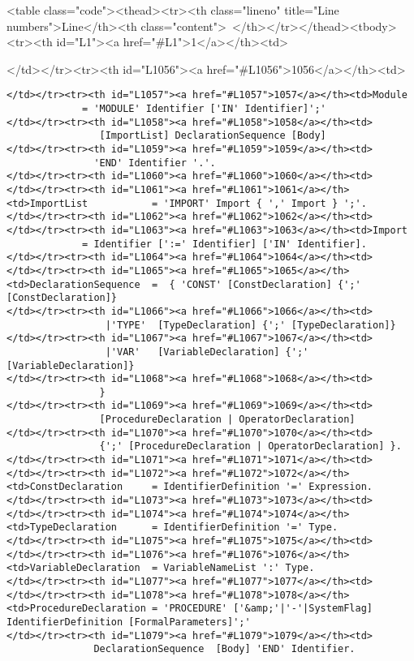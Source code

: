 <table class="code"><thead><tr><th class="lineno" title="Line numbers">Line</th><th class="content"> </th></tr></thead><tbody><tr><th id="L1"><a href="#L1">1</a></th><td>\documentclass[a4paper,11pt]{article}
\begin{document}
</td></tr><tr><th id="L1056"><a href="#L1056">1056</a></th><td>\begin{lstlisting}[language = EBNF, frame=none,xleftmargin=0mm]
</td></tr><tr><th id="L1057"><a href="#L1057">1057</a></th><td>Module               = 'MODULE' Identifier ['IN' Identifier]';'
</td></tr><tr><th id="L1058"><a href="#L1058">1058</a></th><td>                        [ImportList] DeclarationSequence [Body]
</td></tr><tr><th id="L1059"><a href="#L1059">1059</a></th><td>                       'END' Identifier '.'.
</td></tr><tr><th id="L1060"><a href="#L1060">1060</a></th><td>
</td></tr><tr><th id="L1061"><a href="#L1061">1061</a></th><td>ImportList           = 'IMPORT' Import { ',' Import } ';'.
</td></tr><tr><th id="L1062"><a href="#L1062">1062</a></th><td>
</td></tr><tr><th id="L1063"><a href="#L1063">1063</a></th><td>Import               = Identifier [':=' Identifier] ['IN' Identifier].
</td></tr><tr><th id="L1064"><a href="#L1064">1064</a></th><td>
</td></tr><tr><th id="L1065"><a href="#L1065">1065</a></th><td>DeclarationSequence  =  { 'CONST' [ConstDeclaration] {';' [ConstDeclaration]}
</td></tr><tr><th id="L1066"><a href="#L1066">1066</a></th><td>                         |'TYPE'  [TypeDeclaration] {';' [TypeDeclaration]}
</td></tr><tr><th id="L1067"><a href="#L1067">1067</a></th><td>                         |'VAR'   [VariableDeclaration] {';' [VariableDeclaration]}
</td></tr><tr><th id="L1068"><a href="#L1068">1068</a></th><td>                        }
</td></tr><tr><th id="L1069"><a href="#L1069">1069</a></th><td>                        [ProcedureDeclaration | OperatorDeclaration]
</td></tr><tr><th id="L1070"><a href="#L1070">1070</a></th><td>                        {';' [ProcedureDeclaration | OperatorDeclaration] }.
</td></tr><tr><th id="L1071"><a href="#L1071">1071</a></th><td>
</td></tr><tr><th id="L1072"><a href="#L1072">1072</a></th><td>ConstDeclaration     = IdentifierDefinition '=' Expression.
</td></tr><tr><th id="L1073"><a href="#L1073">1073</a></th><td>
</td></tr><tr><th id="L1074"><a href="#L1074">1074</a></th><td>TypeDeclaration      = IdentifierDefinition '=' Type.
</td></tr><tr><th id="L1075"><a href="#L1075">1075</a></th><td>
</td></tr><tr><th id="L1076"><a href="#L1076">1076</a></th><td>VariableDeclaration  = VariableNameList ':' Type.
</td></tr><tr><th id="L1077"><a href="#L1077">1077</a></th><td>
</td></tr><tr><th id="L1078"><a href="#L1078">1078</a></th><td>ProcedureDeclaration = 'PROCEDURE' ['&amp;'|'-'|SystemFlag] IdentifierDefinition [FormalParameters]';'
</td></tr><tr><th id="L1079"><a href="#L1079">1079</a></th><td>                       DeclarationSequence  [Body] 'END' Identifier.

\end{lstlisting}
\end{document}
